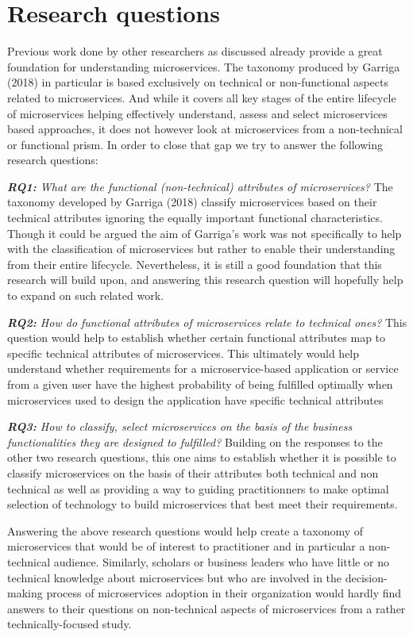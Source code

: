 \documentclass{article}
\begin{document}
\section{Research questions}

Previous work done by other researchers as discussed already provide a great foundation for understanding microservices. The taxonomy produced by Garriga (2018) in particular is based exclusively on technical or non-functional aspects related to microservices. And while it covers all key stages of the entire lifecycle of microservices helping effectively understand, assess and select microservices based approaches, it does not however look at microservices from a non-technical or functional prism. In order to close that gap we try to answer the following research questions:

\textit{\textbf{RQ1:} What are the functional (non-technical) attributes of microservices?} The taxonomy developed by Garriga (2018) classify microservices based on their technical attributes ignoring the equally important functional characteristics. Though it could be argued the aim of Garriga's work was not specifically to help with the classification of microservices but rather to enable their understanding from their entire lifecycle. Nevertheless, it is still a good foundation that this research will build upon, and answering this research question will hopefully help to expand on such related work. 

\textit{\textbf{RQ2:} How do functional attributes of microservices relate to technical ones?} This question would help to establish whether certain functional attributes map to specific technical attributes of microservices. This ultimately would help understand whether requirements for a microservice-based application or service from a given user have the highest probability of being fulfilled optimally when microservices used to design the application have specific technical attributes

\textit{\textbf{RQ3:} How to classify, select microservices on the basis of the business functionalities they are designed to fulfilled?} Building on the responses to the other two research questions, this one aims to establish whether it is possible to classify microservices on the basis of their attributes both technical and non technical as well as providing a way to guiding practitionners to make optimal selection of technology to build microservices that best meet their requirements.

Answering the above research questions would help create a taxonomy of microservices that would be of interest to practitioner and in particular a non-technical audience. Similarly, scholars or business leaders who have little or no technical knowledge about microservices but who are involved in the decision-making process of microservices adoption in their organization would hardly find answers to their questions on non-technical aspects of microservices from a rather technically-focused study.
\end{document}
